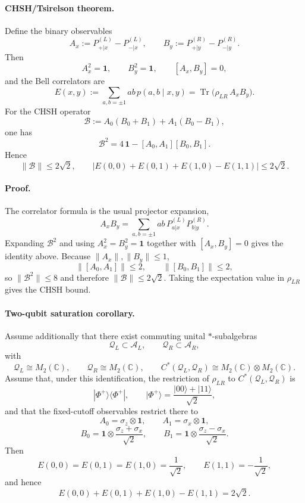 \documentclass[11pt]{article}
\begin{document}
\paragraph{CHSH/Tsirelson theorem.}
Define the binary observables
\[
A_x:=P_{+|x}^{(L)}-P_{-|x}^{(L)},
\qquad
B_y:=P_{+|y}^{(R)}-P_{-|y}^{(R)}.
\]
Then
\[
A_x^2=\mathbf 1,
\qquad
B_y^2=\mathbf 1,
\qquad
[A_x,B_y]=0,
\]
and the Bell correlators are
\begin{equation}
E(x,y)
:=
\sum_{a,b=\pm1}ab\,p(a,b\mid x,y)
=
\operatorname{Tr}\!\bigl(\rho_{LR}\,A_xB_y\bigr).
\end{equation}
For the CHSH operator
\begin{equation}
\mathcal B
:=
A_0(B_0+B_1)+A_1(B_0-B_1),
\end{equation}
one has
\begin{equation}
\mathcal B^2
=
4\,\mathbf 1-[A_0,A_1][B_0,B_1].
\end{equation}
Hence
\begin{equation}
\|\mathcal B\|
\le
2\sqrt 2,
\qquad
\bigl|E(0,0)+E(0,1)+E(1,0)-E(1,1)\bigr|
\le
2\sqrt 2.
\end{equation}

\paragraph{Proof.}
The correlator formula is the usual projector expansion,
\[
A_xB_y
=
\sum_{a,b=\pm1}ab\,P_{a|x}^{(L)}P_{b|y}^{(R)}.
\]
Expanding \(\mathcal B^2\) and using \(A_x^2=B_y^2=\mathbf 1\) together with
\([A_x,B_y]=0\) gives the identity above. Because \(\|A_x\|,\|B_y\|\le 1\),
\[
\|[A_0,A_1]\|\le 2,
\qquad
\|[B_0,B_1]\|\le 2,
\]
so \(\|\mathcal B^2\|\le 8\) and therefore \(\|\mathcal B\|\le 2\sqrt2\). Taking the expectation
value in \(\rho_{LR}\) gives the CHSH bound.

\paragraph{Two-qubit saturation corollary.}
Assume additionally that there exist commuting unital \(*\)-subalgebras
\[
\mathcal Q_L\subset \mathcal A_L,
\qquad
\mathcal Q_R\subset \mathcal A_R,
\]
with
\[
\mathcal Q_L\cong M_2(\mathbb C),
\qquad
\mathcal Q_R\cong M_2(\mathbb C),
\qquad
C^*(\mathcal Q_L,\mathcal Q_R)\cong M_2(\mathbb C)\otimes M_2(\mathbb C).
\]
Assume that, under this identification, the restriction of \(\rho_{LR}\) to
\(C^*(\mathcal Q_L,\mathcal Q_R)\) is
\[
|\Phi^+\rangle\!\langle\Phi^+|,
\qquad
|\Phi^+\rangle=\frac{|00\rangle+|11\rangle}{\sqrt2},
\]
and that the fixed-cutoff observables restrict there to
\[
A_0=\sigma_z\otimes \mathbf 1,
\qquad
A_1=\sigma_x\otimes \mathbf 1,
\]
\[
B_0=\mathbf 1\otimes \frac{\sigma_z+\sigma_x}{\sqrt2},
\qquad
B_1=\mathbf 1\otimes \frac{\sigma_z-\sigma_x}{\sqrt2}.
\]
Then
\[
E(0,0)=E(0,1)=E(1,0)=\frac{1}{\sqrt2},
\qquad
E(1,1)=-\frac{1}{\sqrt2},
\]
and hence
\[
E(0,0)+E(0,1)+E(1,0)-E(1,1)=2\sqrt2.
\]
\end{document}
